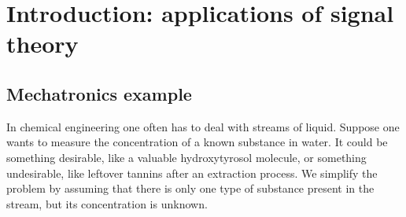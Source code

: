 \documentclass[10pt]{beamer}
\begin{document}
\pagestyle{fancy}
\fancyhead{}
\renewcommand{\headrulewidth}{0pt}
\fancyfoot[C]{\thesection-\thepage}

\begin{frame}
  \titlepage
\end{frame}

\section{Introduction:  applications of signal theory}


\subsection{Mechatronics example}

In chemical engineering one often has to deal with streams of liquid.  Suppose one wants to measure the concentration of a known substance in water.  It could be something desirable, like a valuable hydroxytyrosol molecule, or something undesirable, like leftover tannins after an extraction process.  We simplify the problem by assuming that there is only one type of substance present in the stream, but its concentration is unknown.
\end{document}
